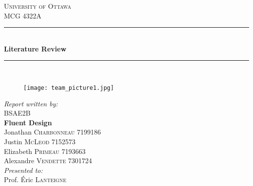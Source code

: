 \documentclass[12pt,twoside]{article}
\begin{document}
	
	\begin{titlepage}
		
		\newcommand{\HRule}{\rule{\linewidth}{0.5mm}} %
		
		\begin{center} %
			
			
			\textsc{\LARGE University of Ottawa}\\[1.0cm] %
			\textsc{\Large MCG 4322A}\\[0.5cm] %
			
			
			\HRule \\[0.4cm]
			{ \huge \bfseries Literature Review}\\[0.4cm] %
			\HRule \\[0.5cm]
			
			\begin{figure}[H]
				\centering
				\texttt{[image: team\_picture1.jpg]} %
			\end{figure}
			
			
			\emph{Report written by:}\\[0.5cm]
			BSAE2B\\
			\textbf{Fluent Design}\\
			Jonathan \textsc{Charbonneau} 7199186\\
			Justin \textsc{McLeod} 7152573\\
			Elizabeth \textsc{Primeau} 7193663\\
			Alexandre \textsc{Vendette} 7301724\\[1cm]
			\emph{Presented to:}\\[0.5cm]
			Prof. Éric \textsc{Lanteigne}\\[1.5cm]
			

\end{center}
\end{titlepage}
\end{document}
